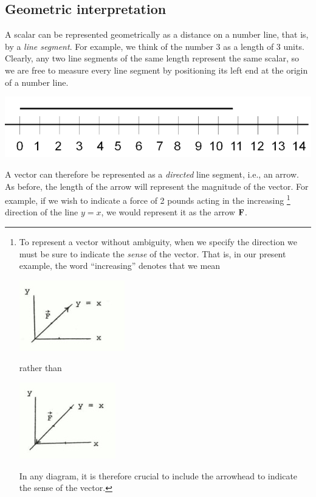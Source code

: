 \documentclass[12pt,letterpaper,reqno]{article}
\numberwithin{equation}{section}
\newcommand{\ti}[1]{\textit{#1}}
\begin{document}
\subsection{Geometric interpretation}
A scalar can be represented geometrically as a distance on a number line, that is, by a  \ti{line segment}. For example, we think of the number 3 as a length of 3 units. Clearly, any two line segments of the same length represent the same scalar, so we are free to measure every line segment by positioning its left end at the origin of a number line.
\begin{center}
	\includegraphics[scale=0.5]{figures_mvc/scalar_number_line}
\end{center}
A vector can therefore be represented as a \ti{directed} line segment, i.e., an arrow. As before, the length of the arrow will represent the magnitude of the vector. For example, if we wish to indicate a force of 2 pounds acting in the increasing \footnote{To represent a vector without ambiguity, when we specify the direction we must be sure to indicate the \ti{sense} of the vector. That is, in our present example, the word ``increasing'' denotes that we mean
\begin{center}
	\includegraphics[scale=0.5]{figures_mvc/sense_1}
\end{center}
rather than
\begin{center}
	\includegraphics[scale=0.5]{figures_mvc/sense_2}
\end{center} In any diagram, it is therefore crucial to include the arrowhead to indicate the sense of the vector.} direction of the line $y=x$, we would represent it as the arrow ${\bf F}$.
\end{document}
